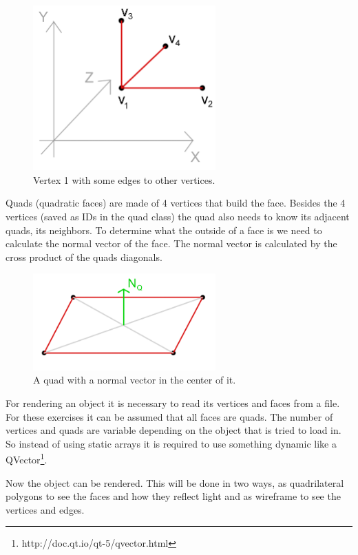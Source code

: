 \documentclass[11.5pt,oneside,a4paper]{scrartcl}
\newcounter{ct}
\begin{document}
\begin{figure}[ht]
\centering
\includegraphics[width=7.0cm]{vertex.png}
\caption{\label{ figtorus}
	Vertex 1 with some edges to other vertices.
}
\end{figure}

\newpage
Quads (quadratic faces) are made of 4 vertices that build the face. Besides the 4 vertices (saved as IDs in the quad class) the quad also needs to know its adjacent quads, its neighbors. To determine what the outside of a face is we need to calculate the normal vector of the face. The normal vector is calculated by the cross product of the quads diagonals.

\begin{figure}[ht]
\centering
\includegraphics[width=7.0cm]{quad.png}
\caption{\label{ figtorus}
	A quad with a normal vector in the center of it.
}
\end{figure}

For rendering an object it is necessary to read its vertices and faces from a file. For these exercises it can be assumed that all faces are quads. The number of vertices and quads are variable depending on the object that is tried to load in. So instead of using static arrays it is required to use something dynamic like a QVector\footnote{http://doc.qt.io/qt-5/qvector.html}.


Now the object can be rendered. This will be done in two ways, as quadrilateral polygons to see the faces and how they reflect light and as wireframe to see the vertices and edges.
\end{document}
